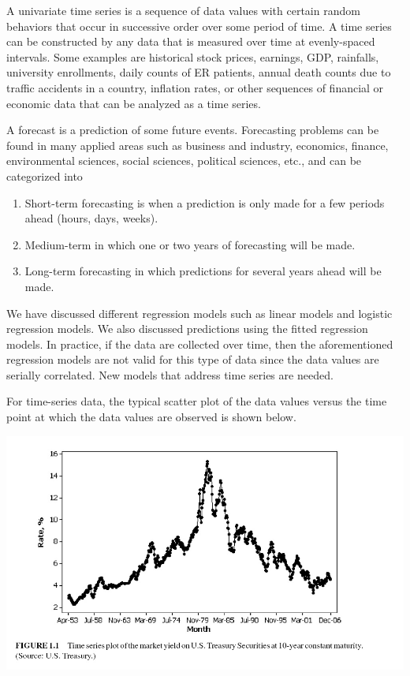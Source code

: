 \documentclass[
]{book}
\begin{document}
A univariate time series is a sequence of data values with certain random behaviors that occur in successive order over some period of time. A time series can be constructed by any data that is measured over time at evenly-spaced intervals. Some examples are historical stock prices, earnings, GDP, rainfalls, university enrollments, daily counts of ER patients, annual death counts due to traffic accidents in a country, inflation rates, or other sequences of financial or economic data that can be analyzed as a time series.

A forecast is a prediction of some future events. Forecasting problems can be found in many applied areas such as business and industry, economics, finance, environmental sciences, social sciences, political sciences, etc., and can be categorized into

\begin{enumerate}
\def\labelenumi{\arabic{enumi}.}
\item
  Short-term forecasting is when a prediction is only made for a few periods ahead (hours, days, weeks).
\item
  Medium-term in which one or two years of forecasting will be made.
\item
  Long-term forecasting in which predictions for several years ahead will be made.
\end{enumerate}

We have discussed different regression models such as linear models and logistic regression models. We also discussed predictions using the fitted regression models. In practice, if the data are collected over time, then the aforementioned regression models are not valid for this type of data since the data values are serially correlated. New models that address time series are needed.

For time-series data, the typical scatter plot of the data values versus the time point at which the data values are observed is shown below.

\begin{center}\includegraphics[width=0.8\linewidth]{img11/w11-Figure01} \end{center}
\end{document}
